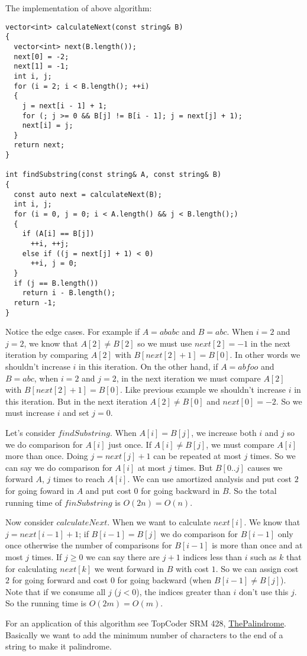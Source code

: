 \documentclass{book}
\begin{document}
	The implementation of above algorithm:
	\begin{lstlisting}
vector<int> calculateNext(const string& B)
{
  vector<int> next(B.length());
  next[0] = -2;
  next[1] = -1;
  int i, j;
  for (i = 2; i < B.length(); ++i)
  {
    j = next[i - 1] + 1;
    for (; j >= 0 && B[j] != B[i - 1]; j = next[j] + 1);
    next[i] = j;
  }
  return next;
}

int findSubstring(const string& A, const string& B)
{
  const auto next = calculateNext(B);
  int i, j;
  for (i = 0, j = 0; i < A.length() && j < B.length();)
  {
    if (A[i] == B[j])
      ++i, ++j;
    else if ((j = next[j] + 1) < 0)
      ++i, j = 0;
  }
  if (j == B.length())
    return i - B.length();
  return -1;
}
	\end{lstlisting}
	Notice the edge cases. For example if $A=ababc$ and $B=abc$. When $i = 2$ and $j = 2$, we know that $A[2] \ne B[2]$ so we must use $next[2] = -1$ in the next iteration by comparing $A[2]$ with $B[next[2] + 1] = B[0]$. In other words we shouldn't increase $i$ in this iteration. On the other hand, if $A=abfoo$ and $B=abc$, when $i = 2$ and $j = 2$, in the next iteration we must compare $A[2]$ with $B[next[2] + 1] = B[0]$. Like previous example we shouldn't increase $i$ in this iteration. But in the next iteration $A[2] \ne B[0]$ and $next[0] = -2$. So we must increase $i$ and set $j=0$.
	\par Let's consider $findSubstring$. When $A[i] = B[j]$, we increase both $i$ and $j$ so we do comparison for $A[i]$ just once. If $A[i] \ne B[j]$, we must compare $A[i]$ more than once. Doing $j = next[j] + 1$ can be repeated at most $j$ times. So we can say we do comparison for $A[i]$ at most $j$ times. But $B[0..j]$ causes we forward $A$, $j$ times to reach $A[i]$. We can use amortized analysis and put cost $2$ for going foward in $A$ and put cost $0$ for going backward in $B$. So the total running time of $finSubstring$ is $O(2n) = O(n)$.
	\par Now consider $calculateNext$. When we want to calculate $next[i]$. We know that $j = next[i - 1] + 1$; if $B[i - 1] = B[j]$ we do comparison for $B[i - 1]$ only once otherwise the number of comparisons for $B[i - 1]$ is more than once and at most $j$ times. If $j \ge 0$ we can say there are $j + 1$ indices less than $i$ such as $k$ that for calculating $next[k]$ we went forward in $B$ with cost $1$. So we can assign cost $2$ for going forward and cost $0$ for going backward (when $B[i - 1] \ne B[j]$). Note that if we consume all $j$ ($j < 0$), the indices greater than $i$ don't use this $j$. So the running time is $O(2m) = O(m)$.
	\par For an application of this algorithm see TopCoder SRM 428, \href{https://community.topcoder.com/stat?c=problem_statement&pm=10182&rd=13519}{ThePalindrome}. Basically we want to add the minimum number of characters to the end of a string to make it palindrome.
\end{document}
